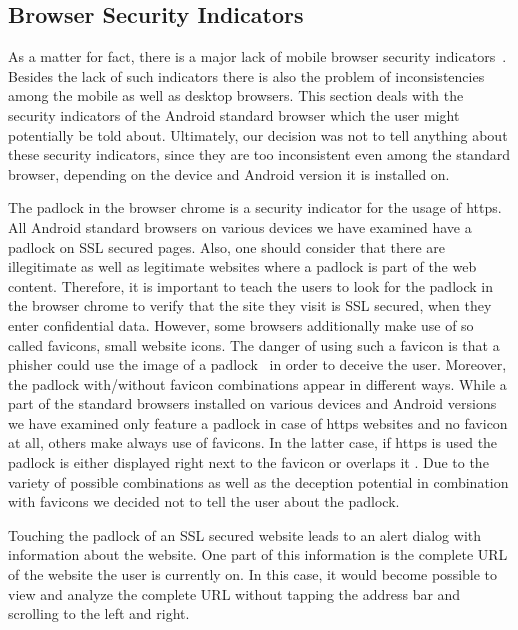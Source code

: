 \subsection{Browser Security Indicators}
As a matter for fact, there is a major lack of mobile browser security indicators~\cite{amrutkar2012measuring,trusteer2011}. 
Besides the lack of such indicators there is also the problem of inconsistencies among the mobile as well as desktop browsers.
This section deals with the security indicators of the Android standard browser which the user might potentially be told about.
Ultimately, our decision was not to tell anything about these security indicators, since they are too inconsistent even among the standard browser, depending on the device and Android version it is installed on.
\begin{description}[leftmargin=0cm]
		\item[Https Padlock] The padlock in the browser chrome is a security indicator for the usage of https.
All Android standard browsers on various devices we have examined have a padlock on SSL secured pages.
Also, one should consider that there are illegitimate as well as legitimate websites where a padlock is part of the web content. 
Therefore, it is important to teach the users to look for the padlock in the browser chrome to verify that the site they visit is SSL secured, when they enter confidential data.
However, some browsers additionally make use of so called favicons, small website icons.
The danger of using such a favicon is that a phisher could use the image of a padlock~\cite{trusteer2011} in order to deceive the user.
Moreover, the padlock with/without favicon combinations appear in different ways. 
While a part of the standard browsers installed on various devices and Android versions we have examined only feature a padlock in case of https websites and no favicon at all, others make always use of favicons. 
In the latter case, if https is used the padlock is either displayed right next to the favicon or overlaps it .
Due to the variety of possible combinations as well as the deception potential in combination with favicons we decided not to tell the user about the padlock.
		\item[Touch Padlock] Touching the padlock of an SSL secured website leads to an alert dialog with information about the website. 
One part of this information is the complete URL of the website the user is currently on.
In this case, it would become possible to view and analyze the complete URL without tapping the address bar and scrolling to the left and right.

\end{description}
